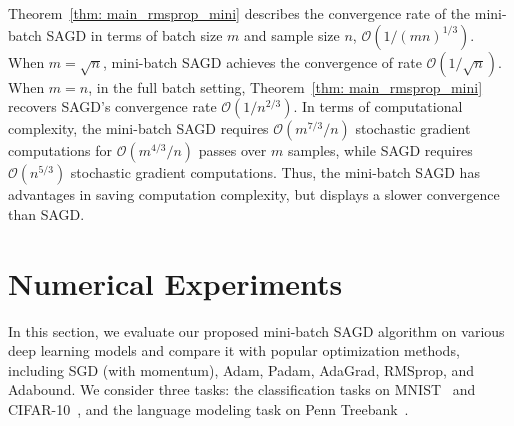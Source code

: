\documentclass[11pt]{article}
\begin{document}
Theorem~\ref{thm: main_rmsprop_mini} 
describes the convergence rate of the mini-batch \textsc{SAGD} in terms of batch size $m$ and sample size $n$, \ie $\mathcal{O}(1/(mn)^{1/3})$. 
When $m = \sqrt{n}$, mini-batch \textsc{SAGD} achieves the convergence of rate $\mathcal{O}(1/\sqrt{n})$. When $m=n$, \ie in the full batch setting, Theorem~\ref{thm: main_rmsprop_mini} recovers \textsc{SAGD}'s convergence rate  $\mathcal{O}(1/n^{2/3})$. 
In terms of computational complexity, the mini-batch \textsc{SAGD} requires $\mathcal{O}(m^{7/3}/n)$ stochastic gradient computations for $\mathcal{O}(m^{4/3}/n)$ passes over $m$ samples, while \textsc{SAGD} requires $\mathcal{O}(n^{5/3})$ stochastic gradient computations. 
Thus, the mini-batch \textsc{SAGD} has advantages in saving computation complexity, but displays a slower convergence than \textsc{SAGD}.

\vspace{-0.05in}
\section{Numerical Experiments} \label{sec: experiment}
\vspace{-0.05in}

In this section, we evaluate our proposed mini-batch \textsc{SAGD} algorithm on various deep learning models and compare it with popular optimization methods, including SGD (with momentum), Adam, Padam,  AdaGrad,  RMSprop, and Adabound. 
We consider three tasks: the classification tasks on MNIST~\citep{lebo1998} and CIFAR-10~\citep{krhi2009}, and the language modeling task on Penn Treebank~\citep{mama1993}. 
\end{document}
